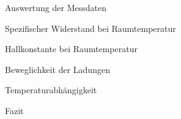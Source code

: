 \documentclass[pdftex, a4paper,11pt, twoside, ngerman]{report}
\begin{document}
  \begin{chapter}{Auswertung der Messdaten}
    \label{chp:Auswertung}
    
    
    
    \begin{section}{Spezifischer Widerstand bei Raumtemperatur}
      \label{chp:AuswertungSpezifischerWiderstandRaumtemperatur}
      
      
      
    \end{section}
   
   
   
    \begin{section}{Hallkonstante bei Raumtemperatur}
      \label{chp:AuswertungHallkonstanteRaumtemperatur}
      
      
      
    \end{section}
    
    
    
    \begin{section}{Beweglichkeit der Ladungen}
      \label{chp:AuswertungBeweglichkeitLadungen}
      
      
     
    \end{section}
   
   
   
    \begin{section}{Temperaturabhängigkeit}
      \label{chp:AuswertungTemperaturen}
      
      
      
    \end{section}
    
    
    
    \begin{section}{Fazit}
      \label{chp:Fazit}
      
      
      
    \end{section}
    
  \end{chapter}
  
\end{document}
